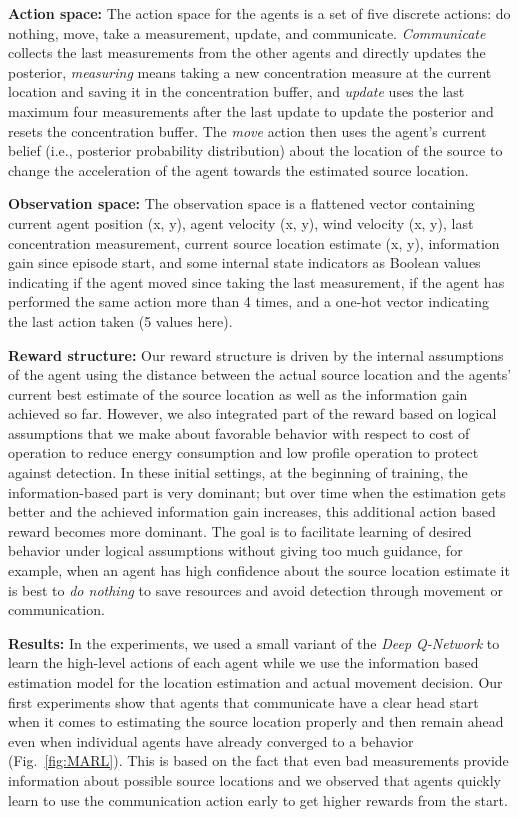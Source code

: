 \documentclass[letterpaper]{article} %
\begin{document}
\textbf{Action space:} The action space for the agents is a set of five discrete actions: do nothing, move, take a measurement, update, and communicate.
\textit{Communicate} collects the last measurements from the other agents and directly updates the posterior, \textit{measuring} means taking a new concentration measure at the current location and saving it in the concentration buffer, and \textit{update} uses the last maximum four measurements after the last update to update the posterior and resets the concentration buffer.
The \textit{move} action then uses the agent's current belief (i.e., posterior probability distribution) about the location of the source to change the acceleration of the agent towards the estimated source location.

\textbf{Observation space:} The observation space is a flattened vector containing current agent position (x, y), agent velocity (x, y), wind velocity (x, y), last concentration measurement, current source location estimate (x, y), information gain since episode start, and some internal state indicators as Boolean values indicating if the agent moved since taking the last measurement, if the agent has performed the same action more than 4 times, and a one-hot vector indicating the last action taken (5 values here).

\textbf{Reward structure:} Our reward structure is driven by the internal assumptions of the agent using the distance between the actual source location and the agents' current best estimate of the source location as well as the information gain achieved so far.
However, we also integrated part of the reward based on logical assumptions that we make about favorable behavior with respect to cost of operation to reduce energy consumption and low profile operation to protect against detection.
In these initial settings, at the beginning of training, the information-based part is very dominant; but over time when the estimation gets better and the achieved information gain increases, this additional action based reward becomes more dominant.
The goal is to facilitate learning of desired behavior under logical assumptions without giving too much guidance, for example, when an agent has high confidence about the source location estimate it is best to \textit{do nothing} to save resources and avoid detection through movement or communication.

\textbf{Results:} In the experiments, we used a small variant of the \textit{Deep Q-Network} \cite{mnih2015human} to learn the high-level actions of each agent while we use the information based estimation model for the location estimation and actual movement decision.
Our first experiments show that agents that communicate have a clear head start when it comes to estimating the source location properly and then remain ahead even when individual agents have already converged to a behavior (Fig.~\ref{fig:MARL}).
This is based on the fact that even bad measurements provide information about possible source locations and we observed that agents quickly learn to use the communication action early to get higher rewards from the start.
\end{document}
